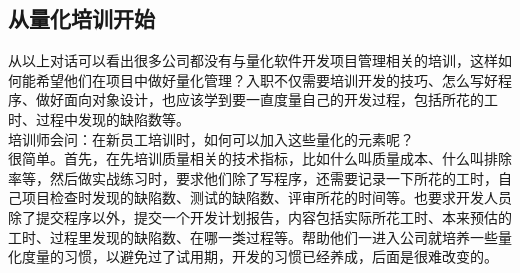 
\hypertarget{ux4eceux91cfux5316ux57f9ux8badux5f00ux59cb}{%
\subsection{从量化培训开始}\label{ux4eceux91cfux5316ux57f9ux8badux5f00ux59cb}}

从以上对话可以看出很多公司都没有与量化软件开发项目管理相关的培训，这样如何能希望他们在项目中做好量化管理？入职不仅需要培训开发的技巧、怎么写好程序、做好面向对象设计，也应该学到要一直度量自己的开发过程，包括所花的工时、过程中发现的缺陷数等。\\
培训师会问：在新员工培训时，如何可以加入这些量化的元素呢？\\
很简单。首先，在先培训质量相关的技术指标，比如什么叫质量成本、什么叫排除率等，然后做实战练习时，要求他们除了写程序，还需要记录一下所花的工时，自己项目检查时发现的缺陷数、测试的缺陷数、评审所花的时间等。也要求开发人员除了提交程序以外，提交一个开发计划报告，内容包括实际所花工时、本来预估的工时、过程里发现的缺陷数、在哪一类过程等。帮助他们一进入公司就培养一些量化度量的习惯，以避免过了试用期，开发的习惯已经养成，后面是很难改变的。

